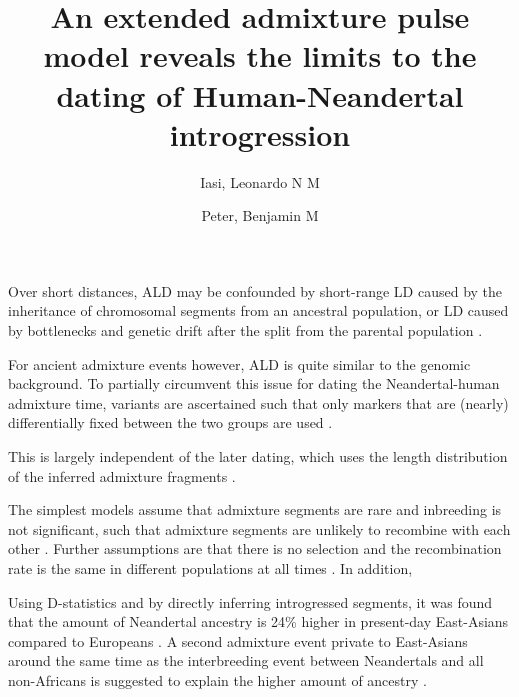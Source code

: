 



\title{An extended admixture pulse model reveals the limits to the dating of Human-Neandertal introgression}

\author[1,2]{Iasi, Leonardo N M}
\author[1,3]{Peter, Benjamin M}




Over short distances, ALD may be confounded by short-range LD caused by the inheritance of chromosomal segments from an ancestral population, or LD caused by bottlenecks and genetic drift after the split from the parental population \citep{moorjani_history_2011}.

For ancient admixture events however, ALD is quite similar to the genomic background. To partially circumvent this issue for dating the Neandertal-human admixture time, variants are ascertained such that only  markers that are (nearly) differentially fixed between the two groups are used 
\citep{sankararaman_date_2012}. 

This is largely independent of the later dating, which uses the length distribution of the inferred admixture fragments \cite{hellenthal_genetic_2014}.

 The simplest models assume that admixture segments are rare and inbreeding is not significant, such that admixture segments are unlikely to recombine with each other \citep{pool_inference_2009,liang_lengths_2014}. Further assumptions are that there is no selection \citep{shchur_distribution_2019} and the recombination rate is the same in different populations at all times \citep{gravel_population_2012}. In addition, 


Using D-statistics \citep{green_draft_2010} and by directly inferring introgressed segments, it was found that the amount of Neandertal ancestry is 24\% higher in present-day East-Asians compared to Europeans \citep{meyer_high-coverage_2012,  wall_higher_2013}. A second admixture event private to East-Asians around the same time as the interbreeding event between Neandertals and all non-Africans is suggested to explain the higher amount of ancestry \citep{kim_selection_2015,vernot_complex_2015}.

